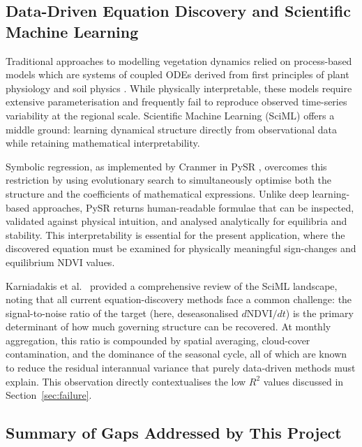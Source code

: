 \documentclass[12pt, a4paper]{article}
\begin{document}
\subsection{Data-Driven Equation Discovery and Scientific Machine Learning}

Traditional approaches to modelling vegetation dynamics relied on process-based models which are systems of coupled ODEs derived from first principles of plant physiology and soil physics \cite{reynolds2007}. While physically interpretable, these models require extensive parameterisation and frequently fail to reproduce observed time-series variability at the regional scale. Scientific Machine Learning (SciML) offers a middle ground: learning dynamical structure directly from observational data while retaining mathematical interpretability.

Symbolic regression, as implemented by Cranmer in PySR \cite{cranmer2023}, overcomes this restriction by using evolutionary search to simultaneously optimise both the structure and the coefficients of mathematical expressions. Unlike deep learning-based approaches, PySR returns human-readable formulae that can be inspected, validated against physical intuition, and analysed analytically for equilibria and stability. This interpretability is essential for the present application, where the discovered equation must be examined for physically meaningful sign-changes and equilibrium NDVI values.

Karniadakis et al.\ \cite{karniadakis2021} provided a comprehensive review of the SciML landscape, noting that all current equation-discovery methods face a common challenge: the signal-to-noise ratio of the target (here, deseasonalised $d\text{NDVI}/dt$) is the primary determinant of how much governing structure can be recovered. At monthly aggregation, this ratio is compounded by spatial averaging, cloud-cover contamination, and the dominance of the seasonal cycle, all of which are known to reduce the residual interannual variance that purely data-driven methods must explain. This observation directly contextualises the low $R^2$ values discussed in Section~\ref{sec:failure}.

\subsection{Summary of Gaps Addressed by This Project}
\end{document}
